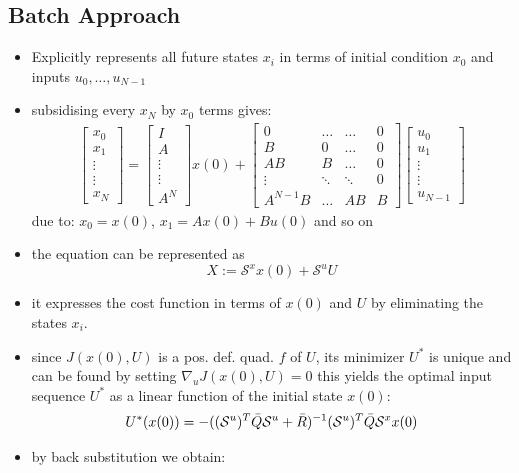 \subsection{Batch Approach}
\begin{itemize}
    \item Explicitly represents all future states $x_i$ in terms of initial condition $x_0$ and inputs $u_0,\dots, u_{N-1}$
    \item subsidising every $x_N$ by $x_0$ terms gives:
    \begin{align*}
        \begin{bmatrix}
            x_0     \\
            x_1     \\
            \vdots  \\
            \vdots  \\
            x_N
        \end{bmatrix} 
        =
        \begin{bmatrix}
            I \\
            A\\
            \vdots\\
            \vdots\\
            A^N
        \end{bmatrix} x(0) +
        \begin{bmatrix}
            0 & \dots & \dots & 0 \\
            B & 0 &\dots & 0\\
            AB & B & \dots & 0 \\
            \vdots & \ddots &\ddots & 0 \\ 
            A^{N-1}B & \dots & AB & B
        \end{bmatrix}
        \begin{bmatrix}
            u_0 \\
            u_1 \\
            \vdots \\
            \vdots \\
            u_{N-1}
        \end{bmatrix}
    \end{align*}
     due to: $x_0 = x(0)$, $x_1 = Ax(0) + Bu(0)$ and so on
     \item the equation can be represented as \[X:=\mathcal{S}^xx(0) + \mathcal{S}^u U\]
\end{itemize}
\begin{itemize}
    \item it expresses the cost function in terms of $x(0)$ and $U$ by eliminating the states $x_i$.
    \item since $J(x(0),U)$ is a pos. def. quad. $f$ of $U$, its minimizer $U^*$ is unique and can be found by setting $\nabla_u J(x(0),U) = 0$ this yields the optimal input sequence $U^*$ as a linear function of the initial state $x(0)$: 
    \[U^*(x(0)) = - ((\mathcal{S}^u)^T\Bar{Q} \mathcal{S}^u + \Bar{R})^{-1}(\mathcal{S}^u)^T\Bar{Q}\mathcal{S}^xx(0)\]
    \item by back substitution we obtain:
\end{itemize}
